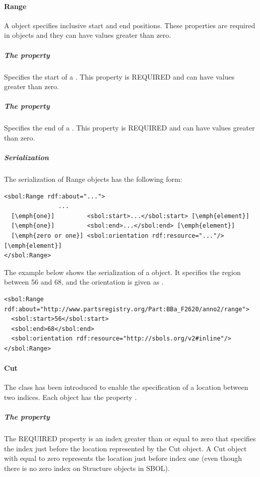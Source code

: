 \paragraph{Range}
\label{sec:Range}
A  object specifies inclusive start and end positions. These properties are required in  objects and they can have  values greater than zero.

\subparagraph{The  property}\label{sec:start}
Specifies the start of a . This property is REQUIRED and can have  values greater than zero.

\subparagraph{The  property}\label{sec:end}
Specifies the end of a . This property is REQUIRED and can have  values greater than zero.

\subparagraph{Serialization}

The serialization of Range objects has the following form:
\begin{lstlisting}
<sbol:Range rdf:about="...">
               ...   
  [\emph{one}]         <sbol:start>...</sbol:start> [\emph{element}] 
  [\emph{one}]         <sbol:end>...</sbol:end> [\emph{element}] 
  [\emph{zero or one}] <sbol:orientation rdf:resource="..."/> [\emph{element}] 
</sbol:Range>
\end{lstlisting}

The example below shows the serialization of a  object. It specifies the region between 56 and 68, and the orientation is given as .
\begin{lstlisting}
<sbol:Range rdf:about="http://www.partsregistry.org/Part:BBa_F2620/anno2/range">
  <sbol:start>56</sbol:start>
  <sbol:end>68</sbol:end>
  <sbol:orientation rdf:resource="http://sbols.org/v2#inline"/>
</sbol:Range>
\end{lstlisting}

\paragraph{Cut}
\label{sec:Cut}
The  class has been introduced to enable the specification of a location between two indices. 
Each  object has the property .

\subparagraph{The  property}
\label{sec:at}
The REQUIRED  property is an index greater than or equal to zero that specifies the index just before the location represented by the Cut object. 
A Cut object with  equal to zero represents the location just before index one (even though there is no zero index on Structure objects in SBOL). 

